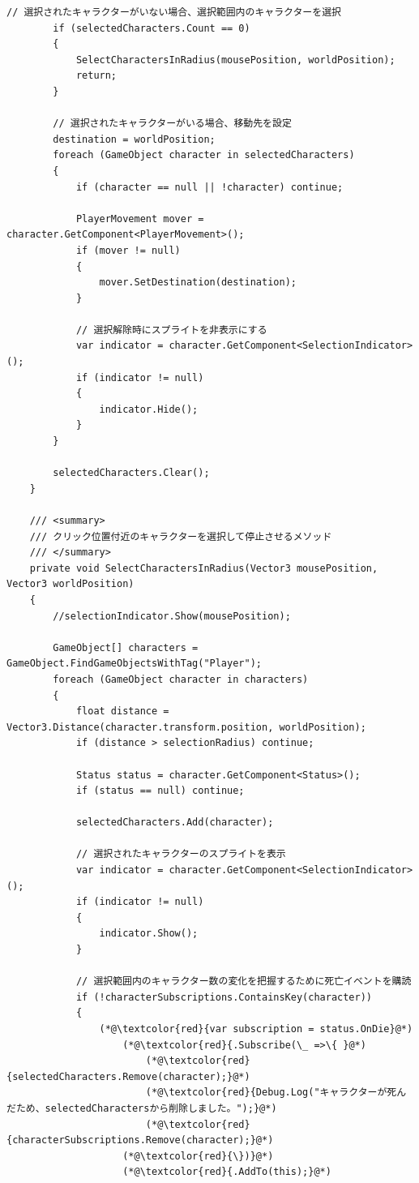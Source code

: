 \documentclass[dvipdfmx,fleqn,article]{jlreq}
\begin{document}
\begin{lstlisting}[language=CSharp, caption=PlayerCommandクラス, label={lst:PlayerCommand}]
        // 選択されたキャラクターがいない場合、選択範囲内のキャラクターを選択
        if (selectedCharacters.Count == 0)
        {
            SelectCharactersInRadius(mousePosition, worldPosition);
            return;
        }

        // 選択されたキャラクターがいる場合、移動先を設定
        destination = worldPosition;
        foreach (GameObject character in selectedCharacters)
        {
            if (character == null || !character) continue;

            PlayerMovement mover = character.GetComponent<PlayerMovement>();
            if (mover != null)
            {
                mover.SetDestination(destination);
            }

            // 選択解除時にスプライトを非表示にする
            var indicator = character.GetComponent<SelectionIndicator>();
            if (indicator != null)
            {
                indicator.Hide();
            }
        }

        selectedCharacters.Clear();
    }

    /// <summary>
    /// クリック位置付近のキャラクターを選択して停止させるメソッド
    /// </summary>
    private void SelectCharactersInRadius(Vector3 mousePosition, Vector3 worldPosition)
    {
        //selectionIndicator.Show(mousePosition);

        GameObject[] characters = GameObject.FindGameObjectsWithTag("Player");
        foreach (GameObject character in characters)
        {
            float distance = Vector3.Distance(character.transform.position, worldPosition);
            if (distance > selectionRadius) continue;

            Status status = character.GetComponent<Status>();
            if (status == null) continue;

            selectedCharacters.Add(character);

            // 選択されたキャラクターのスプライトを表示
            var indicator = character.GetComponent<SelectionIndicator>();
            if (indicator != null)
            {
                indicator.Show();
            }

            // 選択範囲内のキャラクター数の変化を把握するために死亡イベントを購読
            if (!characterSubscriptions.ContainsKey(character))
            {
                (*@\textcolor{red}{var subscription = status.OnDie}@*)
                    (*@\textcolor{red}{.Subscribe(\_ =>\{ }@*)
                        (*@\textcolor{red}{selectedCharacters.Remove(character);}@*)
                        (*@\textcolor{red}{Debug.Log("キャラクターが死んだため、selectedCharactersから削除しました。");}@*)
                        (*@\textcolor{red}{characterSubscriptions.Remove(character);}@*)
                    (*@\textcolor{red}{\})}@*)
                    (*@\textcolor{red}{.AddTo(this);}@*)


\end{lstlisting}
\end{document}
